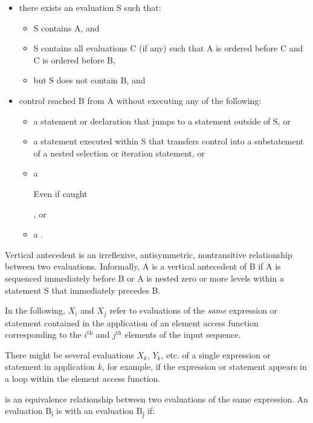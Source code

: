 \begin{itemize}
\item there exists an evaluation S such that:
  \begin{itemize}
    \item S contains A, and
    \item S contains all evaluations C (if any) such that A is ordered before C and C is ordered before B,
    \item but S does not contain B, and
  \end{itemize}
\item control reached B from A without executing any of the following:
  \begin{itemize}
    \item a  statement or  declaration that jumps to a statement outside of S, or
    \item a  statement executed within S that transfers control into a substatement of a nested selection or iteration statement, or
    \item a  \begin{note}Even if caught\end{note}, or
    \item a .
  \end{itemize}
\end{itemize}

\begin{note}
Vertical antecedent is an irreflexive, antisymmetric, nontransitive relationship between two evaluations. Informally, A is a vertical antecedent of B if A is sequenced immediately before B or A is nested zero or more levels within a statement S that immediately precedes B.
\end{note}

\pnum
In the following, $X_i$ and $X_j$ refer to evaluations of the \emph{same} expression
or statement contained in the application of an element access function
corresponding to the $i^\text{th}$ and $j^\text{th}$ elements of the input sequence.
\begin{note}There might be several evaluations $X_k$, $Y_k$, etc. of a single
expression or statement in application $k$, for example, if the expression or
statement appears in a loop within the element access function.\end{note}

\pnum
{} is an equivalence relationship between two
evaluations of the same expression. An evaluation B\textsubscript{i} is
 with an evaluation B\textsubscript{j} if:

